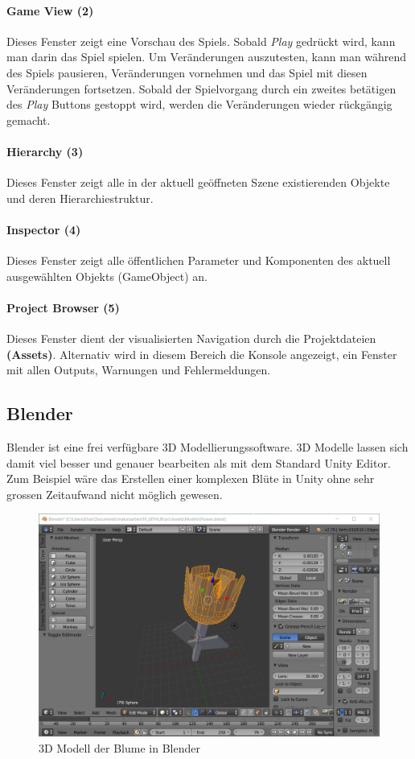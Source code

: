 \paragraph{Game View (2)}
Dieses Fenster zeigt eine Vorschau des Spiels.
Sobald \textit{Play} gedrückt wird, kann man darin das Spiel spielen.
Um Veränderungen auszutesten, kann man während des Spiels pausieren, Veränderungen vornehmen und das Spiel mit diesen Veränderungen fortsetzen. Sobald der Spielvorgang durch ein zweites betätigen des \textit{Play} Buttons gestoppt wird, werden die Veränderungen wieder rückgängig gemacht.

\paragraph{Hierarchy (3)}
Dieses Fenster zeigt alle in der aktuell geöffneten Szene existierenden Objekte und deren Hierarchiestruktur.

\paragraph{Inspector (4)}
Dieses Fenster zeigt alle öffentlichen Parameter und Komponenten des aktuell ausgewählten Objekts (GameObject) an.

\paragraph{Project Browser (5)}
Dieses Fenster dient der visualisierten Navigation durch die Projektdateien \textbf{(Assets)}.
Alternativ wird in diesem Bereich die Konsole angezeigt, ein Fenster mit allen Outputs, Warnungen und Fehlermeldungen.

\subsection{Blender}
Blender ist eine frei verfügbare 3D Modellierungssoftware.
3D Modelle lassen sich damit viel besser und genauer bearbeiten als mit dem Standard Unity Editor. 
Zum Beispiel wäre das Erstellen einer komplexen Blüte in Unity ohne sehr grossen Zeitaufwand nicht möglich gewesen.

\begin{figure}[H]
\includegraphics[scale=0.66]{screenshots/blenderflower.png}
\caption{3D Modell der Blume in Blender}
\end{figure}

